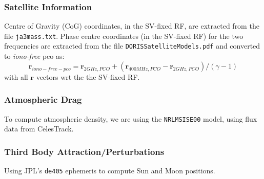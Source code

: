 
\subsubsection{Satellite Information}
Centre of Gravity (CoG) coordinates, in the SV-fixed RF, are extracted from the 
file \texttt{ja3mass.txt}. Phase centre coordinates (in the SV-fixed RF) for the 
two frequencies are extracted from the file \texttt{DORISSatelliteModels.pdf} and 
converted to \emph{iono-free} pco as:
\begin{equation}
  \bm{r}_{iono-free-pco} = \bm{r}_{2GHz,PCO} + (\bm{r}_{400MHz,PCO} - \bm{r}_{2GHz,PCO}) / (\gamma - 1)
\end{equation}
with all $\bm{r}$ vectors wrt the the SV-fixed RF.

\subsubsection{Atmospheric Drag}
To compute atmospheric density, we are using the \texttt{NRLMSISE00} model, 
using flux data from CelesTrack.

\subsubsection{Third Body Attraction/Perturbations}
Using JPL's \texttt{de405} ephemeris to compute Sun and Moon positions.

